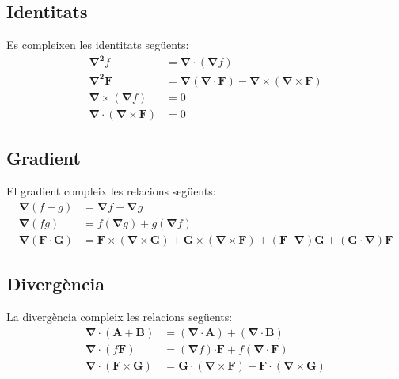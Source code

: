 \documentclass[catalan,a4paper,twoside,11pt]{article}
\begin{document}
\subsection{Identitats}
Es compleixen les identitats seg\"{u}ents:
\begin{align}
    \boldsymbol{\nabla^2}f &=\boldsymbol{\nabla\cdot}(\boldsymbol{\nabla}f)\\
    \boldsymbol{\nabla^2 F}  &= \boldsymbol{\nabla}(\boldsymbol{\nabla\cdot F})
    - \boldsymbol{\nabla\times}(\boldsymbol{\nabla\times F})\\
    \boldsymbol{\nabla\times}(\boldsymbol{\nabla}f) &= 0\\
    \boldsymbol{\nabla\cdot}(\boldsymbol{\nabla\times F}) &= 0
\end{align}

\subsection{Gradient}
El gradient compleix les relacions seg\"{u}ents:
\begin{align}
    \boldsymbol{\nabla}(f+g) &= \boldsymbol{\nabla}f + \boldsymbol{\nabla}g\\
    \boldsymbol{\nabla}(fg) &= f(\boldsymbol{\nabla}g)+g(\boldsymbol{\nabla}f)\\
    \boldsymbol{\nabla}(\boldsymbol{F\cdot G}) &=
    \boldsymbol{F\times}(\boldsymbol{\nabla\times G}) + \boldsymbol{G\times}(\boldsymbol{\nabla\times F}) +
    (\boldsymbol{F\cdot\nabla})\boldsymbol{G} + (\boldsymbol{G\cdot\nabla})\boldsymbol{F}
\end{align}

\subsection{Diverg\`{e}ncia}
La diverg\`{e}ncia compleix les relacions seg\"{u}ents:
\begin{align}
    \boldsymbol{\nabla\cdot}(\boldsymbol{A}+\boldsymbol{B}) &= (\boldsymbol{\nabla\cdot A}) +
    (\boldsymbol{\nabla\cdot B})\\
    \boldsymbol{\nabla\cdot}(f\boldsymbol{F}) &=
    (\boldsymbol{\nabla}f)\boldsymbol{\cdot F} + f(\boldsymbol{\nabla\cdot F})\\
       \boldsymbol{\nabla\cdot}(\boldsymbol{F\times G}) &=
    \boldsymbol{G\cdot}(\boldsymbol{\nabla\times F}) -
    \boldsymbol{F\cdot}(\boldsymbol{\nabla\times G})
\end{align}
\end{document}
